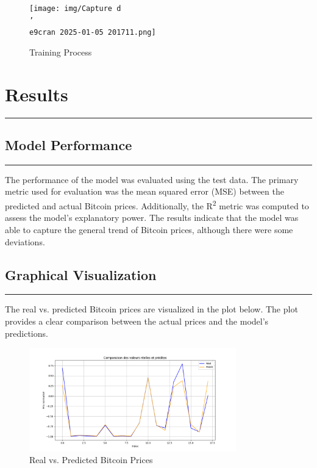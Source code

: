 \documentclass{article}
\begin{document}
\begin{figure}[h]
    \centering
    \texttt{[image: img/Capture d\\'\\e9cran 2025-01-05 201711.png]}
    \caption{Training Process} %
    \label{fig:training}
\end{figure}

\section{Results}
\noindent\rule{\textwidth}{1pt} %
\subsection{Model Performance}
\noindent\rule{\textwidth}{1pt} %
The performance of the model was evaluated using the test data. The primary metric used for evaluation was the mean squared error (MSE) between the predicted and actual Bitcoin prices. Additionally, the R\textsuperscript{2} metric was computed to assess the model's explanatory power. The results indicate that the model was able to capture the general trend of Bitcoin prices, although there were some deviations.

\subsection{Graphical Visualization}
\noindent\rule{\textwidth}{1pt} %
The real vs. predicted Bitcoin prices are visualized in the plot below. The plot provides a clear comparison between the actual prices and the model's predictions.

\begin{figure}[h]
    \centering
    \includegraphics[width=0.8\textwidth]{img/Prediction.png}
    \caption{Real vs. Predicted Bitcoin Prices} %
    \label{fig:predictions}
\end{figure}
\end{document}
